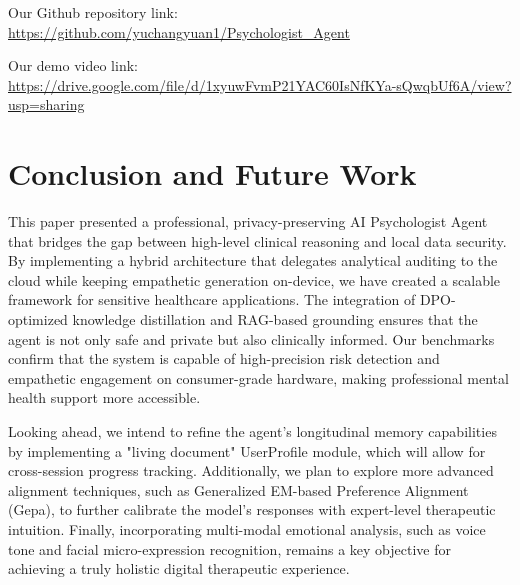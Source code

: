\documentclass[conference]{IEEEtran}
\begin{document}
Our Github repository link: 
\url{https://github.com/yuchangyuan1/Psychologist_Agent}

Our demo video link: 
\url{https://drive.google.com/file/d/1xyuwFvmP21YAC60IsNfKYa-sQwqbUf6A/view?usp=sharing}

\section{Conclusion and Future Work}
This paper presented a professional, privacy-preserving AI Psychologist Agent that bridges the gap between high-level clinical reasoning and local data security. By implementing a hybrid architecture that delegates analytical auditing to the cloud while keeping empathetic generation on-device, we have created a scalable framework for sensitive healthcare applications. The integration of DPO-optimized knowledge distillation and RAG-based grounding ensures that the agent is not only safe and private but also clinically informed. Our benchmarks confirm that the system is capable of high-precision risk detection and empathetic engagement on consumer-grade hardware, making professional mental health support more accessible.

Looking ahead, we intend to refine the agent's longitudinal memory capabilities by implementing a "living document" UserProfile module, which will allow for cross-session progress tracking. Additionally, we plan to explore more advanced alignment techniques, such as Generalized EM-based Preference Alignment (Gepa), to further calibrate the model's responses with expert-level therapeutic intuition. Finally, incorporating multi-modal emotional analysis, such as voice tone and facial micro-expression recognition, remains a key objective for achieving a truly holistic digital therapeutic experience.
\end{document}
